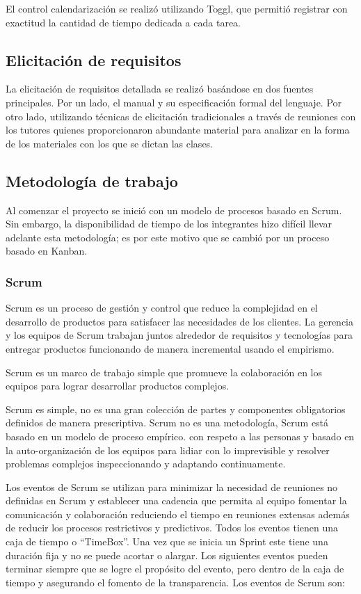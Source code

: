 \documentclass[a4paper,11pt]{article}
\begin{document}
El control calendarización se realizó utilizando Toggl\cite{toggl}, que permitió registrar con exactitud la cantidad de tiempo dedicada a cada tarea.

\subsection{Elicitación de requisitos}

La elicitación de requisitos detallada se realizó basándose en dos fuentes principales. Por un lado, el manual y su especificación formal del lenguaje. Por otro lado, utilizando técnicas de elicitación tradicionales a través de reuniones con los tutores quienes proporcionaron abundante material para analizar en la forma de los materiales con los que se dictan las clases.

\subsection{Metodología de trabajo}

Al comenzar el proyecto se inició con un modelo de procesos basado en  Scrum\cite{scrum}. Sin embargo, la disponibilidad de tiempo de los integrantes hizo difícil llevar adelante esta metodología; es por este motivo que se cambió por un proceso basado en Kanban\cite{kanban}.

\subsubsection{Scrum}

Scrum es un proceso de gestión y control que reduce la complejidad en el desarrollo de productos para satisfacer las necesidades de los clientes. La gerencia y los equipos de Scrum trabajan juntos alrededor de requisitos y tecnologías para entregar productos funcionando de manera incremental usando el empirismo.

Scrum es un marco de trabajo simple que promueve la colaboración en los equipos para lograr desarrollar productos complejos.

Scrum es simple, no es una gran colección de partes y componentes obligatorios definidos de manera prescriptiva. Scrum no es una metodología, Scrum está basado en un modelo de proceso empírico. con respeto a las personas y basado en la auto-organización de los equipos para lidiar con lo imprevisible y resolver problemas complejos inspeccionando y adaptando continuamente.

Los eventos de Scrum se utilizan para minimizar la necesidad de reuniones no definidas en Scrum y establecer una cadencia que permita al equipo fomentar la comunicación y colaboración reduciendo el tiempo en reuniones extensas además de reducir los procesos restrictivos y predictivos. Todos los eventos tienen una caja de tiempo o “TimeBox”. Una vez que se inicia un Sprint este tiene una duración fija y no se puede acortar o alargar. Los siguientes eventos pueden terminar siempre que se logre el propósito del evento, pero dentro de la caja de tiempo y asegurando el fomento de la transparencia. Los eventos de Scrum son:
\end{document}
